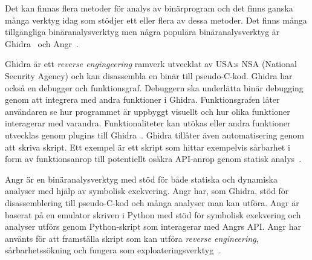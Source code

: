 Det kan finnas flera metoder för analys av binärprogram och det finns ganska
många verktyg idag som stödjer ett eller flera av dessa metoder. Det finns
många tillgängliga binäranalysverktyg men några populära binäranalysverktyg är
Ghidra~\cite{ghidra_website} och Angr~\cite{angr_web}.



Ghidra är ett \emph{reverse engingeering} ramverk utvecklat av USA:s NSA
(National Security Agency) och kan disassembla en binär till pseudo-C-kod.
Ghidra har också en debugger och funktionsgraf. Debuggern ska underlätta binär
debugging genom att integrera med andra funktioner i Ghidra. Funktionsgrafen
låter användaren se hur programmet är uppbyggt visuellt och hur olika
funktioner interagerar med varandra. Funktionaliteter kan utökas eller andra
funktioner utvecklas genom plugins till Ghidra~\cite{ghidra_use_cases}. Ghidra
tillåter även automatisering genom att skriva skript. Ett exempel är ett skript
som hittar exempelvis sårbarhet i form av funktionsanrop till potentiellt
osäkra API-anrop genom statisk analys~\cite{ghidra_script}.

Angr är en binäranalysverktyg med stöd för både statiska och dynamiska analyser
med hjälp av symbolisk exekvering. Angr har, som Ghidra, stöd för
disassemblering till pseudo-C-kod och många analyser man kan utföra. Angr är
baserat på en emulator skriven i Python med stöd för symbolisk exekvering och
analyser utförs genom Python-skript som interagerar med Angrs API. Angr har
använts för att framställa skript som kan utföra \emph{reverse engineering},
sårbarhetssökning och fungera som exploateringsverktyg~\cite{angr_docs}.
